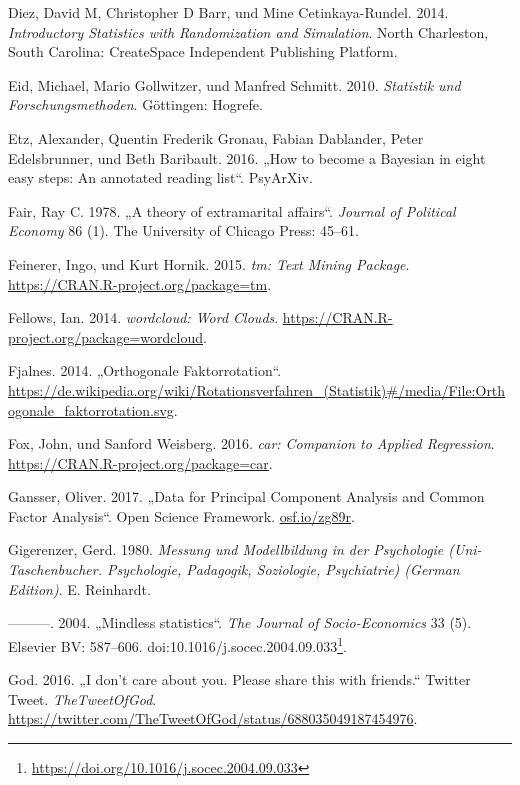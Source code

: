 \documentclass[12pt,ngerman,]{book}
\let\rmarkdownfootnote\footnote%
\def\footnote{\protect\rmarkdownfootnote}
\renewcommand{\href}[2]{#2\footnote{\url{#1}}}
\theoremstyle{definition}
\theoremstyle{definition}
\theoremstyle{remark}
\begin{document}
\hypertarget{ref-introstats}{}
Diez, David M, Christopher D Barr, und Mine Cetinkaya-Rundel. 2014.
\emph{Introductory Statistics with Randomization and Simulation}. North
Charleston, South Carolina: CreateSpace Independent Publishing Platform.

\hypertarget{ref-eid2010statistik}{}
Eid, Michael, Mario Gollwitzer, und Manfred Schmitt. 2010.
\emph{Statistik und Forschungsmethoden}. Göttingen: Hogrefe.

\hypertarget{ref-etz2016become}{}
Etz, Alexander, Quentin Frederik Gronau, Fabian Dablander, Peter
Edelsbrunner, und Beth Baribault. 2016. „How to become a Bayesian in
eight easy steps: An annotated reading list``. PsyArXiv.

\hypertarget{ref-fair1978theory}{}
Fair, Ray C. 1978. „A theory of extramarital affairs``. \emph{Journal of
Political Economy} 86 (1). The University of Chicago Press: 45--61.

\hypertarget{ref-R-tm}{}
Feinerer, Ingo, und Kurt Hornik. 2015. \emph{tm: Text Mining Package}.
\url{https://CRAN.R-project.org/package=tm}.

\hypertarget{ref-R-wordcloud}{}
Fellows, Ian. 2014. \emph{wordcloud: Word Clouds}.
\url{https://CRAN.R-project.org/package=wordcloud}.

\hypertarget{ref-fjalnes_orthogonale_2014}{}
Fjalnes. 2014. „Orthogonale Faktorrotation``.
\url{https://de.wikipedia.org/wiki/Rotationsverfahren_(Statistik)\#/media/File:Orthogonale_faktorrotation.svg}.

\hypertarget{ref-R-car}{}
Fox, John, und Sanford Weisberg. 2016. \emph{car: Companion to Applied
Regression}. \url{https://CRAN.R-project.org/package=car}.

\hypertarget{ref-Gansser_2017}{}
Gansser, Oliver. 2017. „Data for Principal Component Analysis and Common
Factor Analysis``. Open Science Framework. \url{osf.io/zg89r}.

\hypertarget{ref-gigerenzer1980}{}
Gigerenzer, Gerd. 1980. \emph{Messung und Modellbildung in der
Psychologie (Uni-Taschenbucher. Psychologie, Padagogik, Soziologie,
Psychiatrie) (German Edition)}. E. Reinhardt.

\hypertarget{ref-Gigerenzer2004}{}
---------. 2004. „Mindless statistics``. \emph{The Journal of
Socio-Economics} 33 (5). Elsevier BV: 587--606.
doi:\href{https://doi.org/10.1016/j.socec.2004.09.033}{10.1016/j.socec.2004.09.033}.

\hypertarget{ref-god_i_2016}{}
God. 2016. „I don't care about you. Please share this with friends.``
Twitter Tweet. \emph{TheTweetOfGod}.
\url{https://twitter.com/TheTweetOfGod/status/688035049187454976}.
\end{document}

